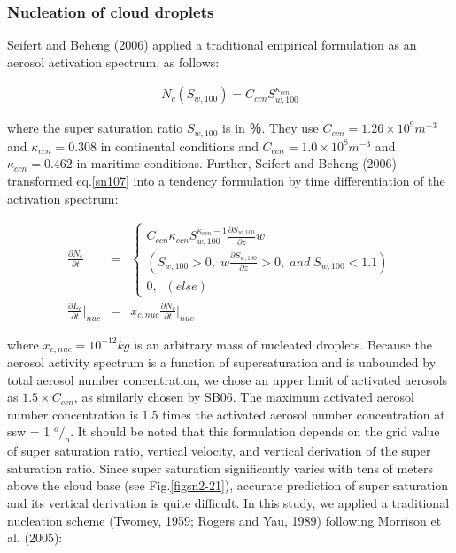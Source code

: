 \subsubsection{Nucleation of cloud droplets}
Seifert and Beheng (2006) applied a traditional empirical formulation as an aerosol activation spectrum, as follows:

\begin{eqnarray}
N_{c}(S_{w,100})=C_{ccn}S_{w,100}^{\kappa_{ccn}}\label{sn107}
\end{eqnarray}

where the super saturation ratio $S_{w,100}$ is in ％. They use $C_{ccn} = 1.26 \times 10^{9} m^{-3}$ and $\kappa_{ccn} = 0.308$ in continental conditions and $C_{ccn} = 1.0 \times 10^{8} m^{-3}$ and $\kappa_{ccn} = 0.462$ in maritime conditions. Further, Seifert and Beheng (2006) transformed eq.\ref{sn107} into a tendency formulation by time differentiation of the activation spectrum:

\begin{eqnarray}
\frac{\partial N_{c}}{\partial t}&=&
\left\{
\begin{array}{l}
C_{ccn}\kappa_{ccn}S_{w,100}^{\kappa_{ccn}-1}\frac{\partial S_{w,100}}{\partial z}w\nonumber\\
(S_{w,100}>0,\;w\frac{\partial S_{w,100}}{\partial z}>0,\;and\;S_{w,100}<1.1) \nonumber\\
0,\;\;(else)
\end{array}
\right.\\
\label{sn108}
\frac{\partial L_{c}}{\partial t}\Bigr|_{nuc}&=&x_{c,nuc}\frac{\partial N_{c}}{\partial t}\Bigr|_{nuc}\label{sn109}
\end{eqnarray}

where $x_{c,nuc} = 10^{-12} kg$ is an arbitrary mass of nucleated droplets. Because the aerosol activity spectrum is a function of supersaturation and is unbounded by total aerosol number concentration, we chose an upper limit of activated aerosols as $1.5 \times C_{ccn}$, as similarly chosen by SB06. The maximum activated aerosol number concentration is 1.5 times the activated aerosol number concentration at ssw = 1 $^{o}/_{o}$. It should be noted that this formulation depends on the grid value of super saturation ratio, vertical velocity, and vertical derivation of the super saturation ratio. Since super saturation significantly varies with tens of meters above the cloud base (see Fig.\ref{figsn2-21}), accurate prediction of super saturation and its vertical derivation is quite difficult. In this study, we applied a traditional nucleation scheme (Twomey, 1959; Rogers and Yau, 1989) following Morrison et al. (2005):

